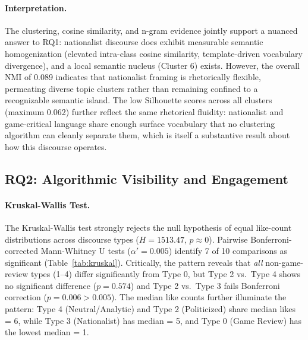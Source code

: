 \documentclass[letterpaper]{article}
\begin{document}
\paragraph{Interpretation.}
The clustering, cosine similarity, and n-gram evidence jointly support a nuanced answer to RQ1: nationalist discourse does exhibit measurable semantic homogenization (elevated intra-class cosine similarity, template-driven vocabulary divergence), and a local semantic nucleus (Cluster 6) exists. However, the overall NMI of 0.089 indicates that nationalist framing is rhetorically flexible, permeating diverse topic clusters rather than remaining confined to a recognizable semantic island. The low Silhouette scores across all clusters (maximum 0.062) further reflect the same rhetorical fluidity: nationalist and game-critical language share enough surface vocabulary that no clustering algorithm can cleanly separate them, which is itself a substantive result about how this discourse operates.

\subsection{RQ2: Algorithmic Visibility and Engagement}
\label{sec:rq2}

\paragraph{Kruskal-Wallis Test.}
The Kruskal-Wallis test strongly rejects the null hypothesis of equal like-count distributions across discourse types ($H = 1513.47$, $p \approx 0$). Pairwise Bonferroni-corrected Mann-Whitney U tests ($\alpha' = 0.005$) identify 7 of 10 comparisons as significant (Table~\ref{tab:kruskal}). Critically, the pattern reveals that \textit{all} non-game-review types (1--4) differ significantly from Type 0, but Type 2 vs.\ Type 4 shows no significant difference ($p = 0.574$) and Type 2 vs.\ Type 3 fails Bonferroni correction ($p = 0.006 > 0.005$). The median like counts further illuminate the pattern: Type 4 (Neutral/Analytic) and Type 2 (Politicized) share median likes = 6, while Type 3 (Nationalist) has median = 5, and Type 0 (Game Review) has the lowest median = 1.
\end{document}
